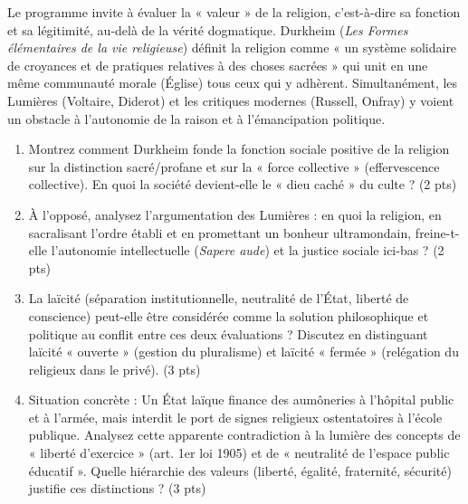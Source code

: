 \documentclass[11pt]{article}
\begin{document}
\begin{exercice}
Le programme invite à évaluer la « valeur » de la religion, c'est-à-dire sa fonction et sa légitimité, au-delà de la vérité dogmatique. Durkheim (\textit{Les Formes élémentaires de la vie religieuse}) définit la religion comme « un système solidaire de croyances et de pratiques relatives à des choses sacrées » qui unit en une même communauté morale (Église) tous ceux qui y adhèrent. Simultanément, les Lumières (Voltaire, Diderot) et les critiques modernes (Russell, Onfray) y voient un obstacle à l'autonomie de la raison et à l'émancipation politique.
\begin{enumerate}
    \item Montrez comment Durkheim fonde la fonction sociale positive de la religion sur la distinction sacré/profane et sur la « force collective » (effervescence collective). En quoi la société devient-elle le « dieu caché » du culte ? (2 pts)
    \item À l'opposé, analysez l'argumentation des Lumières : en quoi la religion, en sacralisant l'ordre établi et en promettant un bonheur ultramondain, freine-t-elle l'autonomie intellectuelle (\textit{Sapere aude}) et la justice sociale ici-bas ? (2 pts)
    \item La laïcité (séparation institutionnelle, neutralité de l'État, liberté de conscience) peut-elle être considérée comme la solution philosophique et politique au conflit entre ces deux évaluations ? Discutez en distinguant laïcité « ouverte » (gestion du pluralisme) et laïcité « fermée » (relégation du religieux dans le privé). (3 pts)
    \item Situation concrète : Un État laïque finance des aumôneries à l'hôpital public et à l'armée, mais interdit le port de signes religieux ostentatoires à l'école publique. Analysez cette apparente contradiction à la lumière des concepts de « liberté d'exercice » (art. 1er loi 1905) et de « neutralité de l'espace public éducatif ». Quelle hiérarchie des valeurs (liberté, égalité, fraternité, sécurité) justifie ces distinctions ? (3 pts)
\end{enumerate}
\end{exercice}
\end{document}
